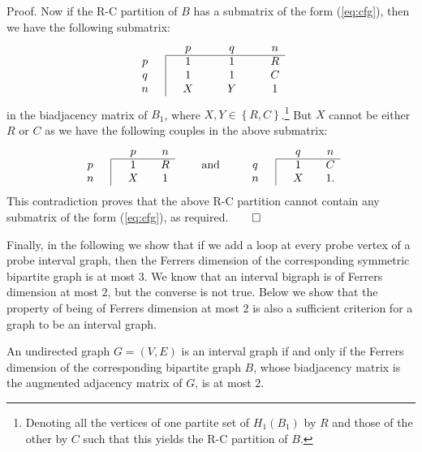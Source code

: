 \documentclass[secthm]{elsart}
\newcommand{\set}[1]{\left\{#1\right\}}
\begin{document}
\begin{pf*}{Proof.}
Now if the R-C partition of $B$ has a submatrix of the form (\ref{eq:cfg}), then we have the following submatrix:
$$\begin{array}{cc|cccccccc}
\multicolumn{3}{c}{} & p &&& q &&& n \\ \cline{3-10}
p &&& 1 &&& 1 &&& R \\
q &&& 1 &&& 1 &&& C \\
n &&& X &&& Y &&& 1
\end{array}$$
in the biadjacency matrix of $B_1$, where $X,Y\in\set{R,C}$.\footnote{Denoting all the vertices of one partite set of $H_1(B_1)$ by $R$ and those of the other by $C$ such that this yields the R-C partition of $B$.} But $X$ cannot be either $R$ or $C$ as we have the following couples in the above submatrix:
$$\begin{array}{cc|cccc}
\multicolumn{3}{c}{} & p && n \\ \cline{3-6}
p &&& 1 && R \\
n &&& X && 1 
\end{array}\qquad \textrm{ and }\qquad \begin{array}{cc|cccc}
\multicolumn{3}{c}{} & q && n \\ \cline{3-6}
q &&& 1 && C \\
n &&& X && 1. 
\end{array}$$
This contradiction proves that the above R-C partition cannot contain any submatrix of the form (\ref{eq:cfg}), as required.\hfill $\qed$
\end{pf*}

Finally, in the following we show that if we add a loop at every probe vertex of a probe interval graph, then the Ferrers dimension of the corresponding symmetric bipartite graph is at most $3$. We know that an interval bigraph is of Ferrers dimension at most $2$, but the converse is not true. Below we show that the property of being of Ferrers dimension at most $2$ is also a sufficient criterion for a graph to be an interval graph.

\begin{prop}
An undirected graph $G=(V,E)$ is an interval graph if and only if the Ferrers dimension of the corresponding bipartite graph $B$, whose biadjacency matrix is the augmented adjacency matrix of $G$, is at most $2$.
\end{prop}
\end{document}
